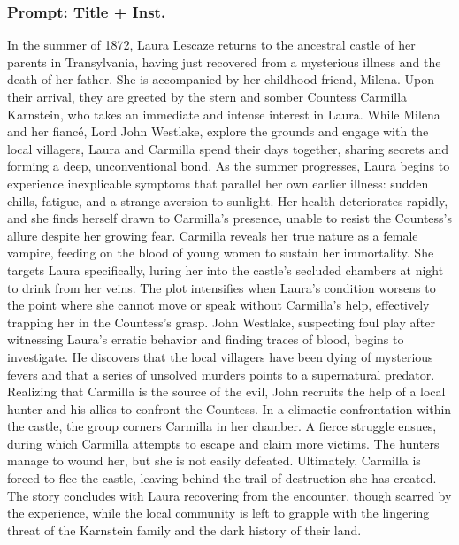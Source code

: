 \documentclass{article} %
\begin{document}
\subsubsection{Prompt: Title + Inst.}

\textcolor{skipred}{In the summer of 1872, Laura Lescaze returns to the ancestral castle of her parents in Transylvania, having just recovered from a mysterious illness and the death of her father. She is accompanied by her childhood friend, Milena.} Upon their arrival, they are greeted by the stern and somber Countess Carmilla Karnstein, who takes an immediate and intense interest in Laura. While Milena and her fiancé, Lord John Westlake, explore the grounds and engage with the local villagers, Laura and Carmilla spend their days together, sharing secrets and forming a deep, unconventional bond. As the summer progresses, Laura begins to experience inexplicable symptoms that parallel her own earlier illness: sudden chills, fatigue, and a strange aversion to sunlight. Her health deteriorates rapidly, and she finds herself drawn to Carmilla's presence, unable to resist the Countess's allure despite her growing fear. \textcolor{skipred}{Carmilla reveals her true nature as a female vampire, feeding on the blood of young women to sustain her immortality. She targets Laura specifically, luring her into the castle's secluded chambers at night to drink from her veins. The plot intensifies when Laura's condition worsens to the point where she cannot move or speak without Carmilla's help, effectively trapping her in the Countess's grasp. John Westlake, suspecting foul play after witnessing Laura's erratic behavior and finding traces of blood, begins to investigate. He discovers that the local villagers have been dying of mysterious fevers and that a series of unsolved murders points to a supernatural predator. Realizing that Carmilla is the source of the evil, John recruits the help of a local hunter and his allies to confront the Countess.} In a climactic confrontation within the castle, the group corners Carmilla in her chamber. A fierce struggle ensues, during which Carmilla attempts to escape and claim more victims. \textcolor{skipred}{The hunters manage to wound her, but she is not easily defeated.} Ultimately, Carmilla is forced to flee the castle, leaving behind the trail of destruction she has created. \textcolor{skipred}{The story concludes with Laura recovering from the encounter, though scarred by the experience, while the local community is left to grapple with the lingering threat of the Karnstein family and the dark history of their land.}
\end{document}
